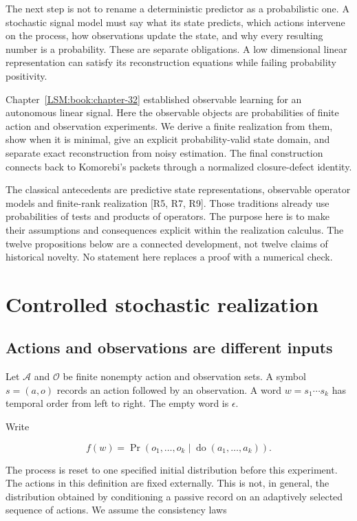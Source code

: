 \label{LSM:part-iii.-controlled-stochastic-realization}

The next step is not to rename a deterministic predictor as a
probabilistic one. A stochastic signal model must say what its state
predicts, which actions intervene on the process, how observations
update the state, and why every resulting number is a probability. These
are separate obligations. A low dimensional linear representation can
satisfy its reconstruction equations while failing probability
positivity.

Chapter~\ref{LSM:book:chapter-32} established observable learning for an autonomous linear signal.
Here the observable objects are probabilities of finite action and
observation experiments. We derive a finite realization from them, show
when it is minimal, give an explicit probability-valid state domain, and
separate exact reconstruction from noisy estimation. The final
construction connects back to Komorebi's packets through a normalized
closure-defect identity.

The classical antecedents are predictive state representations,
observable operator models and finite-rank realization {[}R5, R7, R9{]}.
Those traditions already use probabilities of tests and products of
operators. The purpose here is to make their assumptions and
consequences explicit within the realization calculus. The twelve
propositions below are a connected development, not twelve claims of
historical novelty. No statement here replaces a proof with a numerical
check.


\chapter{Controlled stochastic realization}\label{LSM:book:chapter-33}
\section{Actions and observations are different inputs}\label{LSM:actions-and-observations-are-different-inputs}

Let \(\mathcal A\) and \(\mathcal O\) be finite nonempty action and
observation sets. A symbol \(s=(a,o)\) records an action followed by an
observation. A word \(w=s_1\cdots s_k\) has temporal order from left to
right. The empty word is \(\epsilon\).

Write

\[
f(w)=\Pr(o_1,\ldots,o_k\mid \operatorname{do}(a_1,\ldots,a_k)).
\]

The process is reset to one specified initial distribution before this
experiment. The actions in this definition are fixed externally. This is
not, in general, the distribution obtained by conditioning a passive
record on an adaptively selected sequence of actions. We assume the
consistency laws

